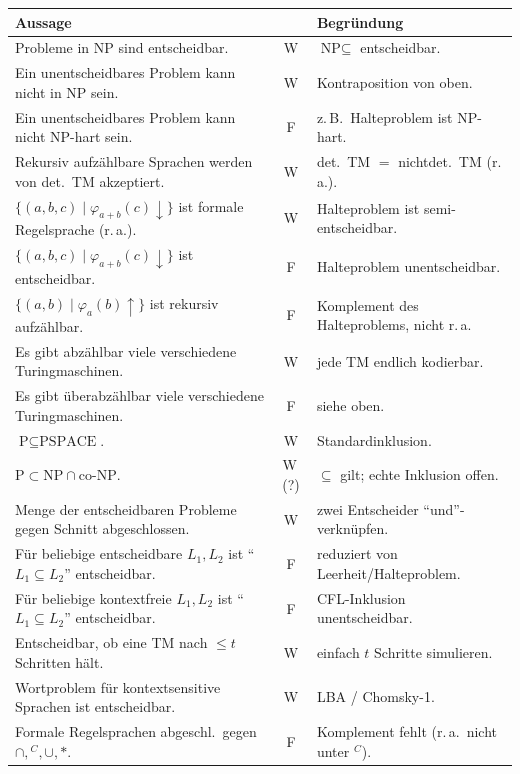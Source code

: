 \begin{mytable}
    \begin{tabular}{@{}p{} c p{}@{}}
        \hline
        \textbf{Aussage} & \textbf{} & \textbf{Begründung}\\
        \hline
        Probleme in NP sind entscheidbar.
        & W & $\text{NP}\subseteq$ entscheidbar.\\
        Ein unentscheidbares Problem kann nicht in NP sein.
        & W & Kontraposition von oben.\\
        Ein unentscheidbares Problem kann nicht NP-hart sein.
        & F & z.\,B.\ Halteproblem ist NP-hart.\\
        Rekursiv aufzählbare Sprachen werden von det.\ TM akzeptiert.
        & W & det.\ TM $=$ nichtdet.\ TM (r.\,a.).\\
        $\{(a,b,c)\mid \varphi_{a+b}(c)\!\downarrow\}$ ist formale Regelsprache (r.\,a.). & W & Halteproblem ist semi-entscheidbar.\\
        $\{(a,b,c)\mid \varphi_{a+b}(c)\!\downarrow\}$ ist entscheidbar.
        & F & Halteproblem unentscheidbar.\\
        $\{(a,b)\mid \varphi_a(b)\!\uparrow\}$ ist rekursiv aufzählbar.
        & F & Komplement des Halteproblems, nicht r.\,a.\\
        Es gibt abzählbar viele verschiedene Turingmaschinen.
        & W & jede TM endlich kodierbar.\\
        Es gibt überabzählbar viele verschiedene Turingmaschinen.
        & F & siehe oben.\\
        $\text{P}\subseteq\text{PSPACE}$.
        & W & Standardinklusion.\\
        $\text{P}\subset\text{NP}\cap\text{co-NP}$.
        & W\,(?) & $\subseteq$ gilt; echte Inklusion offen.\\
        Menge der entscheidbaren Probleme gegen Schnitt abgeschlossen.
        & W & zwei Entscheider ``und''-verknüpfen.\\
        Für beliebige entscheidbare $L_1,L_2$ ist ``$L_1\subseteq L_2$'' entscheidbar.
        & F & reduziert von Leerheit/Halteproblem.\\
        Für beliebige kontextfreie $L_1,L_2$ ist ``$L_1\subseteq L_2$'' entscheidbar.
        & F & CFL-Inklusion unentscheidbar.\\
        Entscheidbar, ob eine TM nach $\le t$ Schritten hält.
        & W & einfach $t$ Schritte simulieren.\\
        Wortproblem für kontextsensitive Sprachen ist entscheidbar.
        & W & LBA / Chomsky-1.\\
        Formale Regelsprachen abgeschl.\ gegen $\cap,{}^C,\cup,*$.
        & F & Komplement fehlt (r.\,a.\ nicht unter $^C$).\\
        \hline
    \end{tabular}
\end{mytable}

